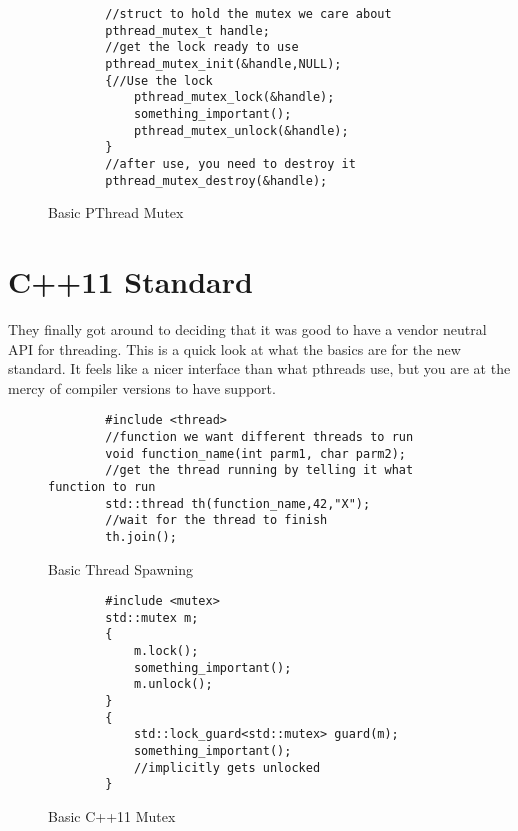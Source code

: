 \documentclass[12pt]{article}
\begin{document}
\begin{figure}[htb]
	\centering
	\begin{verbatim}
		//struct to hold the mutex we care about
		pthread_mutex_t handle;
		//get the lock ready to use
		pthread_mutex_init(&handle,NULL);
		{//Use the lock
			pthread_mutex_lock(&handle);
			something_important();
			pthread_mutex_unlock(&handle);
		}
		//after use, you need to destroy it
		pthread_mutex_destroy(&handle);
	\end{verbatim}
	\caption{Basic PThread Mutex}
\end{figure}

\newpage
\section{C++11 Standard}

They finally got around to deciding that it was good to have a vendor neutral API for threading.
This is a quick look at what the basics are for the new standard.
It feels like a nicer interface than what pthreads use, but you are at the mercy of compiler versions to have support.

\begin{figure}[htb]
	\centering
	\begin{verbatim}
		#include <thread>
		//function we want different threads to run
		void function_name(int parm1, char parm2);
		//get the thread running by telling it what function to run
		std::thread th(function_name,42,"X");
		//wait for the thread to finish
		th.join();
	\end{verbatim}
	\caption{Basic Thread Spawning}
\end{figure}

\begin{figure}[htb]
	\centering
	\begin{verbatim}
		#include <mutex>
		std::mutex m;
		{
			m.lock();
			something_important();
			m.unlock();
		}
		{
			std::lock_guard<std::mutex> guard(m);
			something_important();
			//implicitly gets unlocked
		}
	\end{verbatim}
	\caption{Basic C++11 Mutex}
\end{figure}

\end{document}
